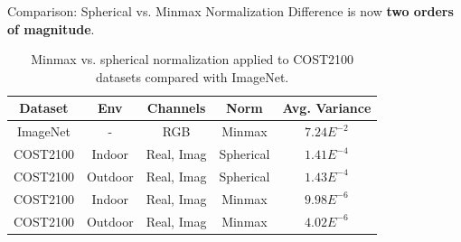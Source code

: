 \documentclass{beamer}
\begin{document}
    \begin{frame}{Comparison: Spherical vs. Minmax Normalization}
    Difference is now \textbf{two orders of magnitude}.
    \begin{table}[htb]
      {\footnotesize
      \begin{center}
        \begin{tabular}{|c|c|c|c|c|}
        \hline
        \textbf{Dataset} & \textbf{Env} & \textbf{Channels} & \textbf{Norm} & \textbf{Avg. Variance} \\ \hline
        ImageNet         & -                    & RGB                 & Minmax                 & \underline{$7.24E^{-2}$}       \\ \hline
        COST2100         & Indoor               & Real, Imag          & Spherical              & \underline{$1.41E^{-4}$}       \\ \hline
        COST2100         & Outdoor              & Real, Imag          & Spherical              & \underline{$1.43E^{-4}$}       \\ \hline
        COST2100         & Indoor               & Real, Imag          & Minmax                 & $9.98E^{-6}$       \\ \hline
        COST2100         & Outdoor              & Real, Imag          & Minmax                 & $4.02E^{-6}$       \\ \hline
        \end{tabular}
        \caption{Minmax vs. spherical normalization applied to COST2100 datasets compared with ImageNet.}
        \label{tab:minmax-sph-compare} 
      \end{center}
      }
    \end{table}
  \end{frame}

\end{document}
